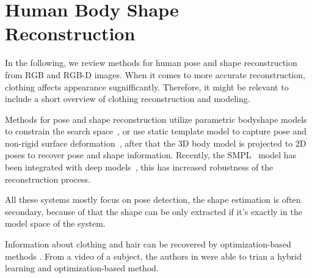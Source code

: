 \section{Human Body Shape Reconstruction}
\label{sec:body_reconstruction}

In the following, we review methods for human pose and shape reconstruction from RGB and RGB-D images.
When it comes to more accurate reconstruction, clothing affects appearance sugnifficantly. Therefore, it might be relevant to include a short overview of clothing reconstruction and modeling.

Methods for pose and shape reconstruction utilize parametric bodyshape models to constrain the search space~\cite{anguelov2005scape,hasler2009statistical,loper2015smpl,pons2015dyna,joo2018total}, or use static template model to capture pose and non-rigid surface deformation~\cite{xu2018monoperfcap,habermann2019livecap}, after that the 3D body model is projected to 2D poses to recover pose and shape information.
Recently, the SMPL~\cite{loper2015smpl} model has been integrated with deep models~\cite{kanazawa2018end,pavlakos2018learning,omran2018neural,tung2017self}, this has increased robustness of the reconstruction process.

All these systems mostly focus on pose detection, the shape estimation is often secondary, because of that the shape can be only extracted if it's exactly in the model space of the system.

Information about clothing and hair can be recovered by optimization-based methods \cite{alldieck2018video,alldieck2018detailed}.
From a video of a subject, the authors in \cite{alldieck2019learning} were able to trian a hybrid learning and optimization-based method.




